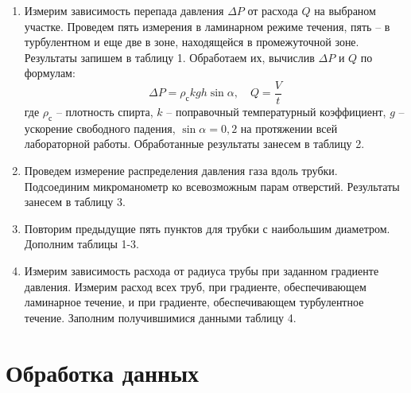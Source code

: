 \documentclass[14pt, a4paper]{report}
\begin{document}
\begin{enumerate}
\item Измерим зависимость перепада давления $\Delta P$ от расхода $Q$ на выбраном участке. Проведем пять измерения в ламинарном режиме течения, пять -- в турбулентном и еще две в зоне, находящейся в промежуточной зоне. Результаты запишем в таблицу 1. Обработаем их, вычислив $\Delta P$ и $Q$ по формулам:
\[\Delta P=\rho_с kgh \sin\alpha,\quad Q=\frac{V}{t}\]
где $\rho_с$ -- плотность спирта, $k$ -- поправочный температурный коэффициент, $g$ -- ускорение свободного падения, $\sin\alpha=0,2$ на протяжении всей лабораторной работы. Обработанные результаты занесем в таблицу 2.

\item Проведем измерение распределения давления газа вдоль трубки. Подсоединим микроманометр ко всевозможным парам отверстий. Результаты занесем в таблицу 3.

\item Повторим предыдущие пять пунктов для трубки с наибольшим диаметром. Дополним таблицы 1-3.

\item Измерим зависимость расхода от радиуса трубы при заданном градиенте давления. Измерим расход всех труб, при градиенте, обеспечивающем ламинарное течение, и при градиенте, обеспечивающем турбулентное течение. Заполним получившимися данными таблицу 4.

\end{enumerate}

\section{Обработка данных}
\end{document}
